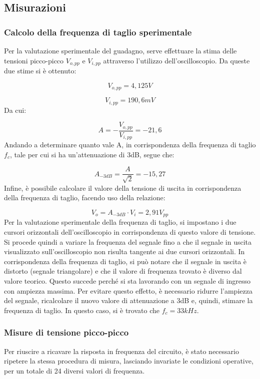 \subsection{Misurazioni}
\subsubsection{Calcolo della frequenza di taglio sperimentale}
Per la valutazione sperimentale del guadagno, serve effettuare la stima delle tensioni picco-picco \(V_{o,pp}\)
e \(V_{i, pp}\) attraverso l'utilizzo dell'oscilloscopio. Da queste due stime si è ottenuto:

\[V_{o,pp}=4,125V\]

\[V_{i, pp}=190,6mV\]
Da cui:

\[A=-\frac{V_{o,pp}}{V_{i, pp}}=-21,6\]
Andando a determinare quanto vale A, in corrispondenza della frequenza di taglio \(f_c\), tale per cui si ha un'attenuazione di 3dB, segue che:

\[A_{-3dB}=\frac{A}{\sqrt{2}}=-15,27\]
Infine, è possibile calcolare il valore della tensione di uscita in corrispondenza della frequenza di
taglio, facendo uso della relazione:

\[V_o=A_{-3dB} \cdot V_i=2,91V_{pp}\]
Per la valutazione sperimentale della frequenza di taglio, si impostano i due cursori orizzontali dell’oscilloscopio in corrispondenza di questo valore di tensione. Si procede quindi a variare la frequenza del segnale fino a che il segnale in uscita visualizzato sull’oscilloscopio non risulta tangente ai due cursori orizzontali. In corrispondenza della frequenza di taglio, si può notare che il segnale in uscita è distorto (segnale triangolare) e che il valore di frequenza trovato è diverso dal valore teorico. Questo succede perché si sta lavorando con un segnale di ingresso con ampiezza massima. Per evitare questo effetto, è necessario ridurre l’ampiezza del segnale, ricalcolare il nuovo valore di attenuazione a 3dB e, quindi, stimare la frequenza di taglio. In questo caso, si è trovato che \(f_c=33kHz\).
\clearpage
\subsubsection{Misure di tensione picco-picco}

Per riuscire a ricavare la risposta in frequenza del circuito, è stato necessario ripetere la stessa procedura di misura, lasciando invariate le condizioni operative, per un totale di 24 diversi valori di frequenza.

